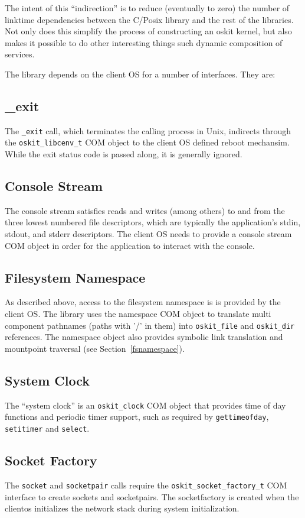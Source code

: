 The intent of this ``indirection'' is to reduce (eventually to zero) the
number of linktime dependencies between the C/Posix library and the rest of
the \oskit{} libraries. Not only does this simplify the process of
constructing an oskit kernel, but also makes it possible to do other
interesting things such dynamic composition of services.

The \posix{} library depends on the client OS for a number of interfaces.
They are:

\subsection{_exit}
\label{oskit-libc-exit}
The \texttt{_exit} call, which terminates the calling process in Unix,
indirects through the \texttt{oskit_libcenv_t} COM object to the client OS
defined reboot mechansim. While the exit status code is passed along, it is
generally ignored. 

\subsection{Console Stream}
The console stream satisfies reads and writes (among others) to and from
the three lowest numbered file descriptors, which are typically the
application's stdin, stdout, and stderr descriptors. The client OS needs to
provide a console stream COM object in order for the application to
interact with the console.

\subsection{Filesystem Namespace}
As described above, access to the filesystem namespace is is provided by
the client OS\@. The \posix{} library uses the namespace COM object to
translate multi component pathnames (paths with '/' in them) into
\texttt{oskit_file} and \texttt{oskit_dir} references.  The namespace
object also provides symbolic link translation and mountpoint traversal
(see Section~\ref{fsnamespace}).

\subsection{System Clock}
The ``system clock'' is an \texttt{oskit_clock} COM object that provides
time of day functions and periodic timer support, such as required by
\texttt{gettimeofday}, \texttt{setitimer} and \texttt{select}.

\subsection{Socket Factory}
The \texttt{socket} and \texttt{socketpair} calls require the
\texttt{oskit_socket_factory_t} COM interface to create sockets and
socketpairs. The socketfactory is created when the clientos initializes the
network stack during system initialization.

